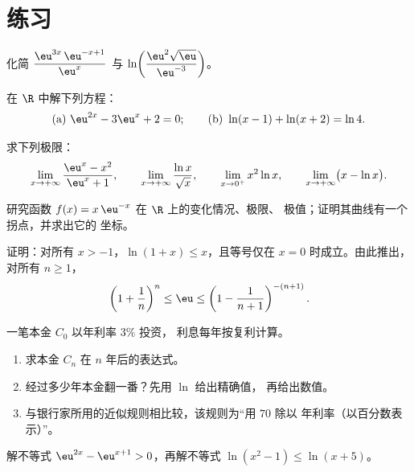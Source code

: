 \section{练习}

\begin{exercise}[$\star$]\label{exo:g12:exp:1}
化简
$\dfrac{\eu^{3x}\,\eu^{-x+1}}{\eu^{x}}$ 与
$\ln\!\left(\dfrac{\eu^2\sqrt{\eu}}{\eu^{-3}}\right)$。
\end{exercise}

\begin{exercise}[$\star$]\label{exo:g12:exp:2}
在 $\R$ 中解下列方程：
\[
\text{(a) } \eu^{2x} - 3\eu^{x} + 2 = 0;
\qquad
\text{(b) } \ln(x - 1) + \ln(x + 2) = \ln 4 .
\]
\end{exercise}

\begin{exercise}[$\star$]\label{exo:g12:exp:3}
求下列极限：
\[
\lim_{x\to+\infty} \frac{\eu^x - x^2}{\eu^x + 1}, \qquad
\lim_{x\to+\infty} \frac{\ln x}{\sqrt x}, \qquad
\lim_{x\to0^+} x^2 \ln x, \qquad
\lim_{x\to+\infty} \bigl(x - \ln x\bigr).
\]
\end{exercise}

\begin{exercise}[$\star\star$]\label{exo:g12:exp:4}
研究函数 $f(x) = x\,\eu^{-x}$ 在 $\R$ 上的变化情况、极限、
极值；证明其曲线有一个拐点，并求出它的
坐标。
\end{exercise}

\begin{exercise}[$\star\star$]\label{exo:g12:exp:5}
证明：对所有 $x > -1$，$\ln(1 + x) \leq x$，且等号仅在
$x = 0$ 时成立。由此推出，对所有 $n \geq 1$，
\[
\left(1 + \frac{1}{n}\right)^n \leq \eu \leq \left(1 - \frac{1}{n+1}\right)^{-(n+1)} .
\]
\end{exercise}

\begin{exercise}[$\star\star$]\label{exo:g12:exp:6}
一笔本金 $C_0$ 以年利率 $3\%$ 投资，
利息每年按复利计算。
\begin{enumerate}
  \item 求本金 $C_n$ 在 $n$ 年后的表达式。
  \item 经过多少年本金翻一番？先用 $\ln$ 给出精确值，
        再给出数值。
  \item 与银行家所用的近似规则相比较，该规则为“用 $70$ 除以
        年利率（以百分数表示）”。
\end{enumerate}
\end{exercise}

\begin{exercise}[$\star\star$]\label{exo:g12:exp:7}
解不等式 $\eu^{2x} - \eu^{x+1} > 0$，再解不等式
$\ln(x^2 - 1) \leq \ln(x + 5)$。
\end{exercise}

